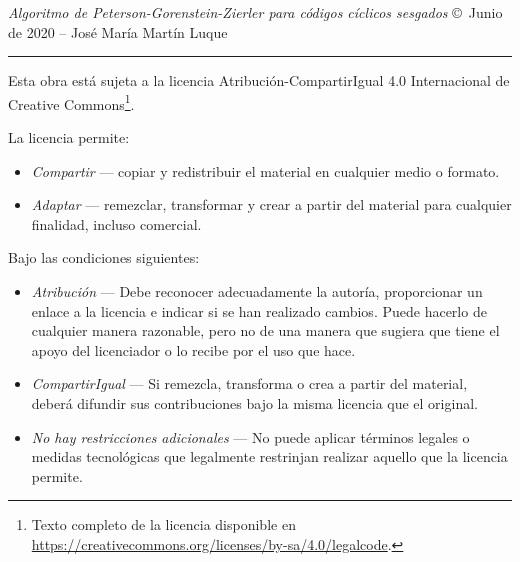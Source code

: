 \thispagestyle{empty}

\hfill

\vfill

\textit{Algoritmo de Peterson-Gorenstein-Zierler para códigos cíclicos sesgados} \; \copyright\ Junio de 2020 -- José María Martín Luque \\ \bigskip

\par\vspace*{\dimexpr-\parskip-\baselineskip+6pt}
\noindent\rule{\textwidth}{0.5pt}

Esta obra está sujeta a la licencia Atribución-CompartirIgual 4.0 Internacional de Creative Commons\footnote{Texto completo de la licencia disponible en \url{https://creativecommons.org/licenses/by-sa/4.0/legalcode}.}.

La licencia permite:
\begin{itemize}
	\item[] \emph{Compartir} --- copiar y redistribuir el material en cualquier medio o formato.
	\item[] \emph{Adaptar} --- remezclar, transformar y crear a partir del material
para cualquier finalidad, incluso comercial.
\end{itemize}

Bajo las condiciones siguientes:
\begin{itemize}
	\item[] \emph{Atribución} --- Debe reconocer adecuadamente la autoría, proporcionar un enlace a la licencia e indicar si se han realizado cambios. Puede hacerlo de cualquier manera razonable, pero no de una manera que sugiera que tiene el apoyo del licenciador o lo recibe por el uso que hace. 
	\item[] \emph{CompartirIgual} --- Si remezcla, transforma o crea a partir del material, deberá difundir sus contribuciones bajo la misma licencia que el original.
	\item[] \emph{No hay restricciones adicionales} --- No puede aplicar términos legales o medidas tecnológicas que legalmente restrinjan realizar aquello que la licencia permite.
\end{itemize}
